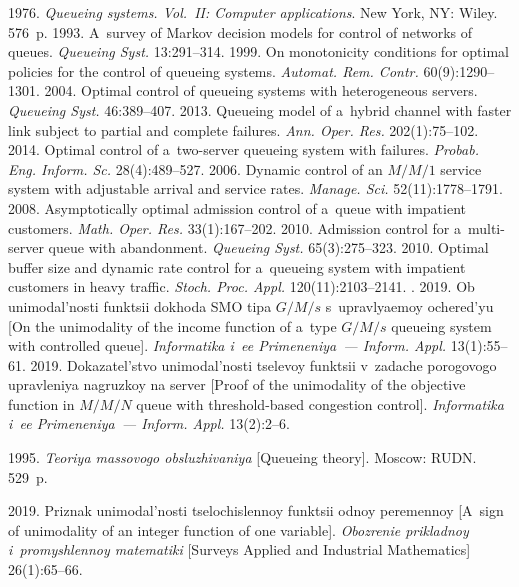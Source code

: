 \begin{multicols}{2}
{{\begin{thebibliography}{99}
 1976. \textit{Queueing systems. Vol.~II: Computer
applications}. New York, NY: Wiley. 576~p.
 1993. A~survey of Markov decision models
for control of networks of queues. \textit{Queueing Syst.} 13:291--314.
 1999. On monotonicity conditions for optimal policies for the
control of queueing systems. \textit{Automat. Rem. Contr.} 60(9):1290--1301.
 2004. Optimal control of queueing systems with
heterogeneous servers. \textit{Queueing Syst.} 46:389--407.
 2013. Queueing model of a~hybrid channel with faster link
subject to partial and complete failures. \textit{Ann. Oper. Res.} 202(1):75--102.
 2014. Optimal control of
a~two-server queueing system with failures. \textit{Probab. Eng.
Inform. Sc.} 28(4):489--527.
 2006. Dynamic control of an $M/M/1$ service
system with adjustable arrival and service rates. \textit{Manage. Sci.}
52(11):1778--1791.
 2008. Asymptotically optimal admission control of
a~queue with impatient customers. \textit{Math. Oper. Res.} 33(1):167--202.
 2010. Admission control for a~multi-server
queue with abandonment.  \textit{Queueing Syst.} 65(3):275--323.
 2010. Optimal buffer size and
dynamic rate control for a~queueing system with impatient customers in heavy
traffic. \textit{Stoch. Proc. Appl.} 120(11):2103--2141.
. 2019. Ob unimodal'nosti funktsii
dokhoda SMO tipa $G/M/s$ s~uprav\-lya\-emoy ochered'yu [On the unimodality of the
income function of a~type $G/M/s$ queueing system with controlled queue].
\textit{Informatika i~ee Primeneniya~--- Inform. Appl.} 13(1):55--61.
 2019. Dokazatel'stvo
unimodal'nosti tselevoy funktsii v~zadache porogovogo upravleniya nagruzkoy na
server [Proof of the unimodality of the objective function in $M/M/N$ queue with
threshold-based congestion control]. \textit{Informatika i~ee Primeneniya~---
Inform. Appl.} 13(2):2--6.

 1995. \textit{Teoriya massovogo
obsluzhivaniya} [Queueing theory]. Moscow: RUDN. 529~p.

 2019. Priznak unimodal'nosti tselochislennoy funktsii
odnoy peremennoy [A~sign of unimodality of an integer function of one variable].
\textit{Obozrenie prikladnoy i~promyshlennoy matematiki} [Surveys Applied and
Industrial Mathematics] 26(1):65--66.

\end{thebibliography}

 }
 }

\end{multicols}

